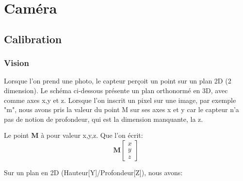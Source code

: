 \documentclass[12pt, french]{report}
\begin{document}
\section{Caméra}
\subsection{Calibration}
\subsubsection{Vision}
Lorsque l'on prend une photo, le capteur perçoit un point sur un plan 2D (2 dimension). Le schéma ci-dessous présente un plan orthonormé en 3D, avec comme axes x,y et z. Lorsque l'on inscrit un pixel sur une image, par exemple "m", nous avons pris la valeur du point M sur ses axes x et y car le capteur n'a pas de notion de profondeur, qui est la dimension manquante, la z.

\begin{center}
\end{center}

Le point \textbf{M} à pour valeur x,y,z. Que l'on écrit: $$\textbf{M}\begin{bmatrix}x\\y\\z\end{bmatrix}$$

Sur un plan en 2D (Hauteur[Y]/Profondeur[Z]), nous avons:\\
\end{document}
